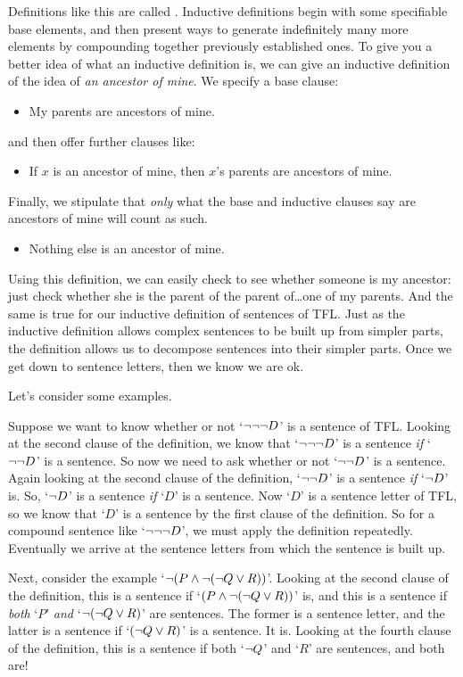 Definitions like this are called . Inductive definitions begin with some specifiable base elements, and then present ways to generate indefinitely many more elements by compounding together previously established ones. To give you a better idea of what an inductive definition is, we can give an inductive definition of the idea of \emph{an ancestor of mine}. We specify a base clause:
	\begin{itemize}
		\item My parents are ancestors of mine.
	\end{itemize}
and then offer further clauses like:
	\begin{itemize}
		\item If $x$ is an ancestor of mine, then $x$'s parents are ancestors of mine.
	\end{itemize}
Finally, we stipulate that \emph{only} what the base and inductive
clauses say are ancestors of mine will count as such.
	\begin{itemize}
		\item Nothing else is an ancestor of mine.
	\end{itemize}
Using this definition, we can easily check to see whether someone is my ancestor: just check whether she is the parent of the parent of\ldots one of my parents. And the same is true for our inductive definition of sentences of TFL. Just as the inductive definition allows complex sentences to be built up from simpler parts, the definition allows us to decompose sentences into their simpler parts. Once we get down to sentence letters, then we know we are ok.

Let's consider some examples.

Suppose we want to know whether or not `$\neg \neg \neg D$' is a sentence of TFL. Looking at the second clause of the definition, we know that `$\neg \neg \neg D$' is a sentence \emph{if} `$\neg \neg D$' is a sentence. So now we need to ask whether or not `$\neg \neg D$' is a sentence. Again looking at the second clause of the definition, `$\neg \neg D$' is a sentence \emph{if} `$\neg D$' is. So, `$\neg D$' is a sentence \emph{if} `$D$' is a sentence. Now `$D$' is a sentence letter of TFL, so we know that `$D$' is a sentence by the first clause of the definition. So for a compound sentence like `$\neg \neg \neg D$', we must apply the definition repeatedly. Eventually we arrive at the sentence letters from which the sentence is built up.

Next, consider the example `$\neg (P \wedge \neg (\neg Q \vee R))$'. Looking at the second clause of the definition, this is a sentence if `$(P \wedge \neg (\neg Q \vee R))$' is, and this is a sentence if \emph{both} `$P$' \emph{and} `$\neg (\neg Q \vee R)$' are sentences. The former is a sentence letter, and the latter is a sentence if `$(\neg Q \vee R)$' is a sentence. It is. Looking at the fourth clause of the definition, this is a sentence if both `$\neg Q$' and `$R$' are sentences, and both are!


